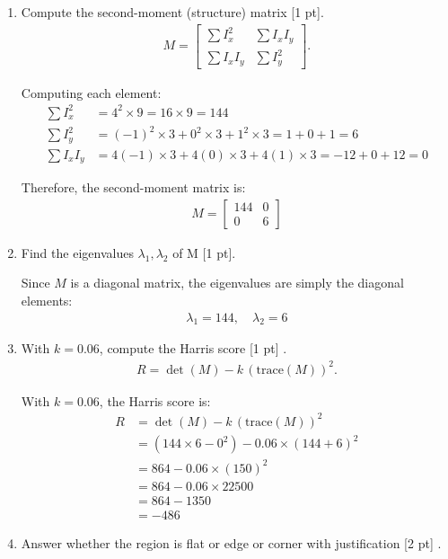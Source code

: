 \documentclass[12pt,a4paper]{article}
\begin{document}
\begin{enumerate}
    \item Compute the second-moment (structure) matrix [1 pt].
\begin{align*}
M=\begin{bmatrix}
\sum I_x^2 & \sum I_x I_y\\[2pt]
\sum I_x I_y & \sum I_y^2
\end{bmatrix}.
\end{align*}

Computing each element:
\begin{align*}
\sum I_x^2 &= 4^2 \times 9 = 16 \times 9 = 144\\[6pt]
\sum I_y^2 &= (-1)^2 \times 3 + 0^2 \times 3 + 1^2 \times 3 = 1 + 0 + 1 = 6\\[6pt]
\sum I_x I_y &= 4(-1) \times 3 + 4(0) \times 3 + 4(1) \times 3 = -12 + 0 + 12 = 0
\end{align*}

Therefore, the second-moment matrix is:
\begin{align*}
M = \begin{bmatrix}
144 & 0\\
0 & 6
\end{bmatrix}
\end{align*}

    \item Find the eigenvalues $\lambda_1,\lambda_2$ of M [1 pt].

    Since $M$ is a diagonal matrix, the eigenvalues are simply the diagonal elements:
\begin{align*}
\lambda_1 = 144, \quad \lambda_2 = 6
\end{align*}

    \item With $k=0.06$, compute the Harris score [1 pt] .
\begin{align*}
R=\det(M)-k\,(\mathrm{trace}(M))^2.
\end{align*}

With $k = 0.06$, the Harris score is:
\begin{align*}
R &= \det(M) - k\,(\mathrm{trace}(M))^2\\[6pt]
&= (144 \times 6 - 0^2) - 0.06 \times (144 + 6)^2\\[6pt]
&= 864 - 0.06 \times (150)^2\\[6pt]
&= 864 - 0.06 \times 22500\\[6pt]
&= 864 - 1350\\[6pt]
&= -486
\end{align*}
    \item Answer whether the region is flat or edge or corner with justification [2 pt] .


\end{enumerate}
\end{document}
